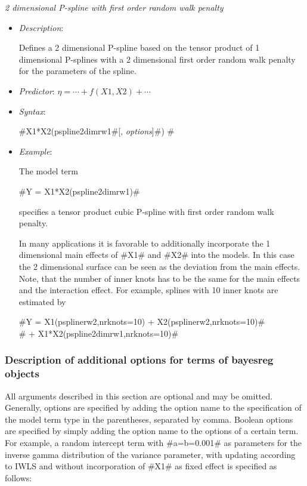 {\em 2 dimensional P-spline with first order random walk penalty}
\begin{itemize}
\item[] {\em Description}:

Defines a 2 dimensional P-spline based on the tensor product of 1
dimensional P-splines with a 2 dimensional first order random walk
penalty for the parameters of the spline.
\item[] {\em Predictor}: $\eta= \cdots + f(X1,X2) + \cdots$
\item[] {\em Syntax}:

#X1*X2(pspline2dimrw1#[, {\em options}]#) #
\item[] {\em Example}:

The model term

#Y = X1*X2(pspline2dimrw1)#

specifies a tensor product cubic P-spline with first order random
walk penalty.

In many applications it is favorable to additionally incorporate
the 1 dimensional main effects of #X1# and #X2# into the models.
In this case the 2 dimensional surface can be seen as the
deviation from the main effects. Note, that the number of inner
knots has to be the same for the main effects and the interaction
effect. For example, splines with 10 inner knots are estimated by


 #Y = X1(psplinerw2,nrknots=10) + X2(psplinerw2,nrknots=10)#\\
 #    + X1*X2(pspline2dimrw1,nrknots=10)#
\end{itemize}



\subsubsection{Description of additional options for terms of bayesreg objects}
\label{localoptions}

All arguments described in this section are optional and may be
omitted. Generally, options are specified by adding the option
name to the specification of the model term type in the
parentheses, separated by comma. Boolean options are specified by
simply adding the option name to the options of a certain term.
For example, a random intercept term with #a=b=0.001# as
parameters for the inverse gamma distribution of the variance
parameter, with updating according to IWLS and without
incorporation of #X1# as fixed effect is specified as follows:

